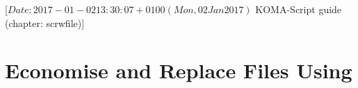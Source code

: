 %
%
%
%
%
%
%
%
% 
%
%
%
%

%
                 [$Date: 2017-01-02 13:30:07 +0100 (Mon, 02 Jan 2017) $
                  KOMA-Script guide (chapter: scrwfile)]



\chapter[{Economise and Replace Files Using \Package{scrwfile}}]
{Economise and Replace Files Using %
}
\BeginIndexGroup
{}

